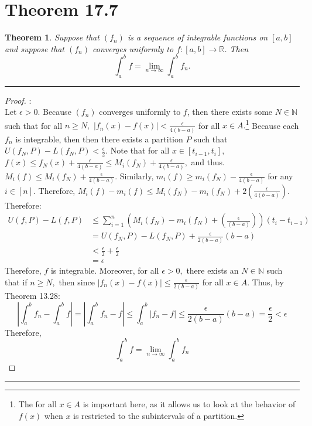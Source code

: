 \documentclass[openany, amssymb, psamsfonts]{amsart}
\newcommand{\bbN}{\mathbb{N}}
\newcommand{\bbR}{\mathbb{R}}
\newtheorem{thm}{Theorem}[section]
\theoremstyle{definition}
\numberwithin{equation}{section}
\begin{document}
\section*{Theorem 17.7}
\begin{thm}
	\label{17.7}
	Suppose that $(f_n)$ is a sequence of integrable functions on $[a, b]$ and suppose that $(f_n)$ converges uniformly to $f\colon [a, b] \to \bbR$. Then
	\[
		\int_{a}^{b} f = \lim_{n \to \infty} \int_{a}^{b} f_n.
	\]
\end{thm}
\vspace{4pt}     \hrule   \vspace{4pt}\begin{proof}:\\
Let $\epsilon>0.$ Because $(f_n)$ converges uniformly to $f$, then there exists some $N \in \bbN$ such that for all $n\geq N,$ $|f_n(x) - f(x)|< \frac{\epsilon}{4(b-a)}$ for all $x\in A.$\footnote{The for all $x\in A$ is important here, as it allows us to look at the behavior of $f(x)$ when $x$ is restricted to the subintervals of a partition.} Because each $f_n$ is integrable, then then there exists a partition $P$ such that $U(f_N, P) - L(f_N, P)< \frac{\epsilon}{2}.$ Note that for all $x\in [t_{i-1}, t_{i}],$ $f(x) \leq f_N(x) + \frac{\epsilon}{4(b-a)}\leq M_i(f_N) +\frac{\epsilon}{4(b-a)},$ and thus. $M_i(f)\leq M_i(f_N) +\frac{\epsilon}{4(b-a)}.$ Similarly, $m_i(f)\geq m_i(f_N) - \frac{\epsilon}{4(b-a)}$ for any $i \in [n].$ Therefore, $M_i(f) - m_i(f)\leq M_i(f_N) - m_i(f_N) + 2(\frac{\epsilon}{4(b-a)}).$ Therefore:
\begin{align*}
U(f,P) - L(f,P) &\leq \displaystyle\sum_{i=1}^n(M_i(f_N) - m_i(f_N) + (\frac{\epsilon}{(b-a)}))(t_i-t_{i-1})\\
&= U(f_N, P) - L(f_N,P) + \frac{\epsilon}{2(b-a)}(b-a)\\
&< \frac{\epsilon}{2} + \frac{\epsilon}{2}\\
&= \epsilon
\end{align*}
Therefore, $f$ is integrable. Moreover, for all $\epsilon>0,$ there exists an $N \in \bbN$ such that if $n\geq N,$ then since $|f_n(x) - f(x)|\leq \frac{\epsilon}{2(b-a)}$ for all $x\in A.$ Thus, by Theorem 13.28:
\[|\int_a^bf_n - \int_a^bf| = |\int_a^bf_n -f|\leq \int_a^b|f_n -f|\leq \frac{\epsilon}{2(b-a)}(b-a) = \frac{\epsilon}{2}< \epsilon\]
Therefore, \[\int_a^bf = \lim_{n\to \infty}\int_a^b f_n\]
\end{proof}\vspace{4pt}     \hrule   \vspace{4pt}
\end{document}
